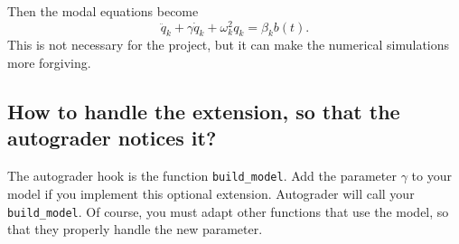 \documentclass[11pt]{article}
\begin{document}
Then the modal equations become
\[
\ddot q_k + \gamma \dot q_k + \omega_k^2 q_k = \beta_k b(t).
\]
This is not necessary for the project, but it can make the numerical 
simulations more forgiving.

\subsection{How to handle the extension, so that the autograder notices it?}
The autograder hook is the function \texttt{build\_model}. Add the
parameter \(\gamma\) to your model if you implement this optional extension.
Autograder will call your \texttt{build\_model}. Of course, you must
adapt other functions that use the model, so that they properly handle
the new parameter.
\end{document}
